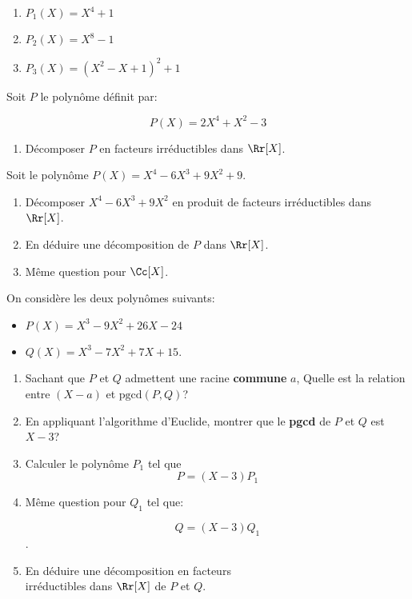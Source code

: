 \documentclass[10pt, a4paper, twocolumn]{homework}
\begin{document}
\begin{enumerate}
  \item $P_1(X) = X^4 + 1$
  \item $P_2(X) = X^8 - 1$
  \item $P_3(X) = \left(X^2 - X+1\right)^2+1$
\end{enumerate}
Soit $P$ le polynôme définit par:

$$
P(X) = 2X^4 + X^2 -3
$$
\begin{enumerate}
  \item 
Décomposer $P$ en facteurs irréductibles dans $\Rr[X]$.
\end{enumerate}
Soit le polynôme $P(X) = X^4-6X^3+9X^2+9$.

\begin{enumerate}
  \item Décomposer $X^4-6X^3+9X^2$ en produit de facteurs irréductibles dans
    $\Rr[X]$.
  \item En déduire une décomposition de $P$ dans $\Rr[X]$.

  \item Même question pour $\Cc[X]$.
\end{enumerate}
On considère les deux polynômes suivants:

\begin{itemize}
  \item $P(X) = X^3 - 9X^2 + 26X -24$
  \item $Q(X) = X^3 - 7X^2 + 7X + 15$.
\end{itemize}
\begin{enumerate}
  \item Sachant que $P$ et $Q$ admettent une racine \textbf{commune} $a$,
    Quelle est la relation entre $(X-a)$ et $\text{pgcd}(P,Q)$?
  \item En appliquant l'algorithme d'Euclide, montrer  que le \textbf{pgcd} de $P$
    et $Q$ est $X-3$?
  

  \item Calculer le polynôme $P_1$ tel que
    $$ P = (X-3)P_1$$

  \item Même question pour $Q_1$ tel que:

    $$Q = (X-3)Q_1$$.

  \item En déduire une décomposition en facteurs\\ irréductibles dans
    $\Rr[X]$ de $P$ et $Q$.
\end{enumerate}
\end{document}
